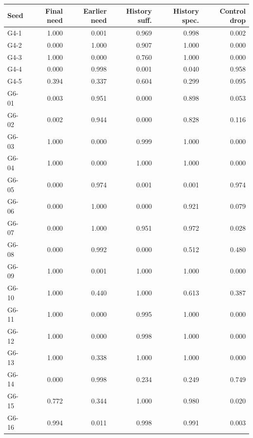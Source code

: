 \begin{tabular}{lrrrrr}
\toprule
Seed & Final need & Earlier need & History suff. & History spec. & Control drop \\
\midrule
G4-1 & 1.000 & 0.001 & 0.969 & 0.998 & 0.002 \\
G4-2 & 0.000 & 1.000 & 0.907 & 1.000 & 0.000 \\
G4-3 & 1.000 & 0.000 & 0.760 & 1.000 & 0.000 \\
G4-4 & 0.000 & 0.998 & 0.001 & 0.040 & 0.958 \\
G4-5 & 0.394 & 0.337 & 0.604 & 0.299 & 0.095 \\
G6-01 & 0.003 & 0.951 & 0.000 & 0.898 & 0.053 \\
G6-02 & 0.002 & 0.944 & 0.000 & 0.828 & 0.116 \\
G6-03 & 1.000 & 0.000 & 0.999 & 1.000 & 0.000 \\
G6-04 & 1.000 & 0.000 & 1.000 & 1.000 & 0.000 \\
G6-05 & 0.000 & 0.974 & 0.001 & 0.001 & 0.974 \\
G6-06 & 0.000 & 1.000 & 0.000 & 0.921 & 0.079 \\
G6-07 & 0.000 & 1.000 & 0.951 & 0.972 & 0.028 \\
G6-08 & 0.000 & 0.992 & 0.000 & 0.512 & 0.480 \\
G6-09 & 1.000 & 0.001 & 1.000 & 1.000 & 0.000 \\
G6-10 & 1.000 & 0.440 & 1.000 & 0.613 & 0.387 \\
G6-11 & 1.000 & 0.000 & 0.995 & 1.000 & 0.000 \\
G6-12 & 1.000 & 0.000 & 0.998 & 1.000 & 0.000 \\
G6-13 & 1.000 & 0.338 & 1.000 & 1.000 & 0.000 \\
G6-14 & 0.000 & 0.998 & 0.234 & 0.249 & 0.749 \\
G6-15 & 0.772 & 0.344 & 1.000 & 0.980 & 0.020 \\
G6-16 & 0.994 & 0.011 & 0.998 & 0.991 & 0.003 \\
\bottomrule
\end{tabular}
